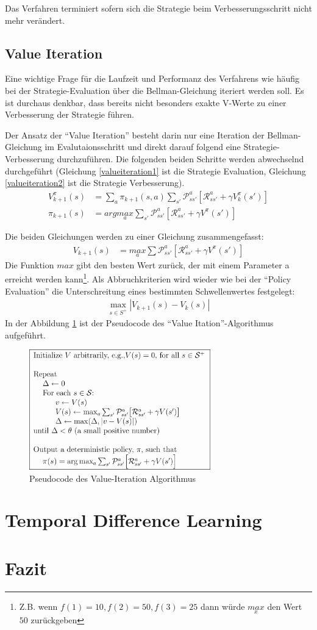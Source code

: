 \documentclass[10pt]{scrartcl}
\begin{document}
Das Verfahren terminiert sofern sich die Strategie beim Verbesserungsschritt nicht mehr verändert.

\subsection{Value Iteration}
Eine wichtige Frage für die Laufzeit und Performanz des Verfahrens wie häufig bei der Strategie-Evaluation über die Bellman-Gleichung iteriert werden soll. Es ist durchaus denkbar, dass bereits nicht besonders exakte V-Werte zu einer Verbesserung der Strategie führen.

Der Ansatz der ``Value Iteration'' besteht darin nur eine Iteration der Bellman-Gleichung im Evalutaionsschritt und direkt darauf folgend eine Strategie-Verbesserung durchzuführen.
Die folgenden beiden Schritte werden abwechselnd durchgeführt (Gleichung \ref{valueiteration1} ist die Strategie Evaluation, Gleichung \ref{valueiteration2} ist die Strategie Verbesserung).
\begin{align}\label{valueiteration1}
V^\pi_{k+1}(s) &= \sum\limits_{a} \pi_{k+1}(s,a) \sum\limits_{s'}\mathcal{P}^a_{ss'}[\mathcal{R}^a_{ss'}+\gamma V^\pi_k(s')]\\
\pi_{k+1}(s) &= arg\underset{a}{max}\sum_{s'}\mathcal{P}^a_{ss'}[\mathcal{R}^a_{ss'}+\gamma V^\pi(s')]\label{valueiteration2}
\end{align}

Die beiden Gleichungen werden zu einer Gleichung zusammengefasst:
\begin{align}
V_{k+1}(s) &= \underset{a}{max}\sum\mathcal{P}^a_{ss'}[\mathcal{R}^a_{ss'}+\gamma V^\pi(s')]
\end{align}
Die Funktion $max$ gibt den besten Wert zurück, der mit einem Parameter a erreicht werden kann\footnote{Z.B. wenn $f(1)=10, f(2)=50, f(3) = 25$ dann würde $\underset{x}{max}$ den Wert $50$ zurückgeben}. Als Abbruchkriterien wird wieder wie bei der ``Policy Evaluation'' die Unterschreitung eines bestimmten Schwellenwertes festgelegt: 
\begin{align}
\max\limits_{s\in S^+} |V_{k+1}(s)-V_k(s)|
\end{align}
In der Abbildung \ref{fig:valueiteration} ist der Pseudocode des ``Value Itation''-Algorithmus aufgeführt.
\begin{figure}[htc]
    \centering
    \includegraphics[width=0.7\textwidth]{Grafiken/24vi.png}
    \caption{Pseudocode des Value-Iteration Algorithmus}
    \label{fig:valueiteration}
\end{figure}

\section{Temporal Difference Learning}

\section{Fazit}
\end{document}
